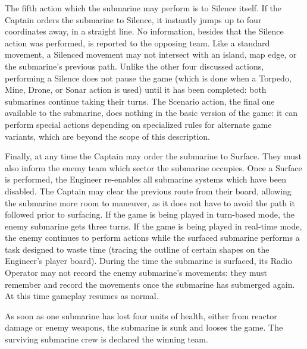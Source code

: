 The fifth action which the submarine may perform is to Silence itself. If the Captain orders the submarine to Silence, it instantly jumps up to four coordinates away, in a straight line. No information, besides that the Silence action was performed, is reported to the opposing team. Like a standard movement, a Silenced movement may not intersect with an island, map edge, or the submarine's previous path. Unlike the other four discussed actions, performing a Silence does not pause the game (which is done when a Torpedo, Mine, Drone, or Sonar action is used) until it has been completed: both submarines continue taking their turns. The Scenario action, the final one available to the submarine, does nothing in the basic version of the game: it can perform special actions depending on specialized rules for alternate game variants, which are beyond the scope of this description.


Finally, at any time the Captain may order the submarine to Surface. They must also inform the enemy team which sector the submarine occupies. Once a Surface is performed, the Engineer re-enables all submarine systems which have been disabled. The Captain may clear the previous route from their board, allowing the submarine more room to maneuver, as it does not have to avoid the path it followed prior to surfacing. If the game is being played in turn-based mode, the enemy submarine gets three turns. If the game is being played in real-time mode, the enemy continues to perform actions while the surfaced submarine performs a task designed to waste time (tracing the outline of certain shapes on the Engineer's player board). During the time the submarine is surfaced, its Radio Operator may not record the enemy submarine's movements: they must remember and record the movements once the submarine has submerged again. At this time gameplay resumes as normal.

As soon as one submarine has lost four units of health, either from reactor damage or enemy weapons, the submarine is sunk and looses the game. The surviving submarine crew is declared the winning team.







